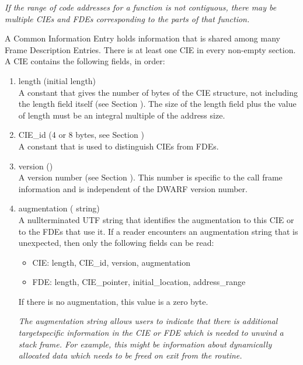 \textit{If the range of code addresses for a function is not
contiguous, there may be multiple CIEs and FDEs corresponding
to the parts of that function.}


A Common Information Entry holds information that is shared
among many Frame Description Entries. There is at least one
CIE in every non-empty  section. A CIE contains
the following fields, in order:
\begin{enumerate}[1. ]
\item length (initial length)  \\
A constant that gives the number of bytes of the CIE structure,
not including the length field itself 
(see Section ). 
The
size of the length field plus the value of length must be an
integral multiple of the address size.

\item  CIE\_id (4 or 8 bytes, see Section ) \\
A constant that is used to distinguish CIEs from FDEs.

\item  version () \\
A version number 
(see Section ). 
This number is specific to the call frame information
and is independent of the DWARF version number.

\item  augmentation ( string) \\
A null\dash terminated UTF string that identifies the augmentation
to this CIE or to the FDEs that use it. If a reader encounters
an augmentation string that is unexpected, then only the
following fields can be read:


\begin{itemize}

\item CIE: length, CIE\_id, version, augmentation

\item FDE: length, CIE\_pointer, initial\_location, address\_range

\end{itemize}
If there is no augmentation, this value is a zero byte.

\textit{The augmentation string allows users to indicate that there
is additional target\dash specific information in the CIE or FDE
which is needed to unwind a stack frame. For example, this
might be information about dynamically allocated data which
needs to be freed on exit from the routine.}


\end{enumerate}
